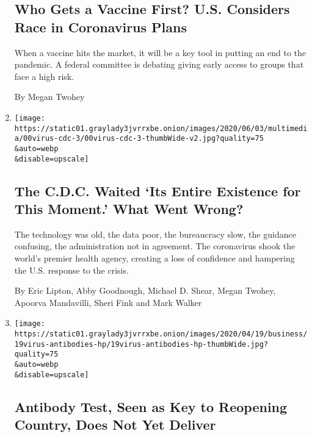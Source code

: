 \begin{enumerate}
  \hypertarget{who-gets-a-vaccine-first-us-considers-race-in-coronavirus-plans}{%
  \subsection{Who Gets a Vaccine First? U.S. Considers Race in
  Coronavirus
  Plans}\label{who-gets-a-vaccine-first-us-considers-race-in-coronavirus-plans}}

  When a vaccine hits the market, it will be a key tool in putting an
  end to the pandemic. A federal committee is debating giving early
  access to groups that face a high risk.

  By Megan Twohey
\item
  \href{/2020/06/03/us/cdc-coronavirus.html}{}

  \texttt{[image: https://static01.graylady3jvrrxbe.onion/images/2020/06/03/multimedia/00virus-cdc-3/00virus-cdc-3-thumbWide-v2.jpg?quality=75\\\&auto=webp\\\&disable=upscale]}

  \hypertarget{the-cdc-waited-its-entire-existence-for-this-moment-what-went-wrong}{%
  \subsection{The C.D.C. Waited `Its Entire Existence for This Moment.'
  What Went
  Wrong?}\label{the-cdc-waited-its-entire-existence-for-this-moment-what-went-wrong}}

  The technology was old, the data poor, the bureaucracy slow, the
  guidance confusing, the administration not in agreement. The
  coronavirus shook the world's premier health agency, creating a loss
  of confidence and hampering the U.S. response to the crisis.

  By Eric Lipton, Abby Goodnough, Michael D. Shear, Megan Twohey,
  Apoorva Mandavilli, Sheri Fink and Mark Walker
\item
  \href{/2020/04/19/us/coronavirus-antibody-tests.html}{}

  \texttt{[image: https://static01.graylady3jvrrxbe.onion/images/2020/04/19/business/19virus-antibodies-hp/19virus-antibodies-hp-thumbWide.jpg?quality=75\\\&auto=webp\\\&disable=upscale]}

  \hypertarget{antibody-test-seen-as-key-to-reopening-country-does-not-yet-deliver}{%
  \subsection{Antibody Test, Seen as Key to Reopening Country, Does Not
  Yet
  Deliver}\label{antibody-test-seen-as-key-to-reopening-country-does-not-yet-deliver}}


\end{enumerate}
